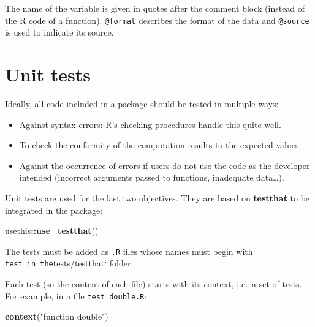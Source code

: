 \documentclass[
  12pt,
  american,
  a4paper,
  extrafontsizes,onecolumn,openright
  ]{memoir}
\newenvironment{Shaded}{\begin{snugshade}}{\end{snugshade}}
\newcommand{\FunctionTok}[1]{\textcolor[rgb]{0.13,0.29,0.53}{\textbf{#1}}}
\newcommand{\NormalTok}[1]{#1}
\newcommand{\SpecialCharTok}[1]{\textcolor[rgb]{0.81,0.36,0.00}{\textbf{#1}}}
\newcommand{\StringTok}[1]{\textcolor[rgb]{0.31,0.60,0.02}{#1}}
\providecommand{\tightlist}{%
  \setlength{\itemsep}{0pt}\setlength{\parskip}{0pt}}
\begin{document}
\normalsize

The name of the variable is given in quotes after the comment block (instead of the R code of a function).
\texttt{@format} describes the format of the data and \texttt{@source} is used to indicate its source.

\section{Unit tests}\label{unit-tests}

Ideally, all code included in a package should be tested in multiple ways:

\begin{itemize}
\tightlist
\item
  Against syntax errors: R's checking procedures handle this quite well.
\item
  To check the conformity of the computation results to the expected values.
\item
  Against the occurrence of errors if users do not use the code as the developer intended (incorrect arguments passed to functions, inadequate data\ldots).
\end{itemize}

Unit tests are used for the last two objectives.
They are based on \textbf{testthat} to be integrated in the package:

\scriptsize

\begin{Shaded}
\begin{Highlighting}[]
\NormalTok{usethis}\SpecialCharTok{::}\FunctionTok{use\_testthat}\NormalTok{()}
\end{Highlighting}
\end{Shaded}

\normalsize

\scriptsize

\normalsize

The tests must be added as \texttt{.R} files whose names must begin with \texttt{test\textquotesingle{}\ in\ the}tests/testthat` folder.

Each test (so the content of each file) starts with its context, i.e.~a set of tests. For example, in a file \texttt{test\_double.R}:

\scriptsize

\begin{Shaded}
\begin{Highlighting}[]
\FunctionTok{context}\NormalTok{(}\StringTok{"function double"}\NormalTok{)}
\end{Highlighting}
\end{Shaded}
\end{document}

